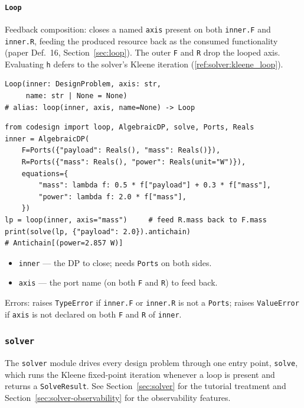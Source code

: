 \documentclass[11pt,a4paper]{article}
\begin{document}
\paragraph{\texttt{Loop}}
\label{ref:composition:loop}
Feedback composition: closes a named \texttt{axis} present on both
\texttt{inner.F} and \texttt{inner.R}, feeding the produced resource back
as the consumed functionality (paper Def.~16, Section~\ref{sec:loop}).
The outer \texttt{F} and \texttt{R} drop the looped axis. Evaluating
\texttt{h} defers to the solver's Kleene iteration
(\ref{ref:solver:kleene_loop}).
\begin{lstlisting}
Loop(inner: DesignProblem, axis: str,
     name: str | None = None)
# alias: loop(inner, axis, name=None) -> Loop
\end{lstlisting}
\begin{lstlisting}
from codesign import loop, AlgebraicDP, solve, Ports, Reals
inner = AlgebraicDP(
    F=Ports({"payload": Reals(), "mass": Reals()}),
    R=Ports({"mass": Reals(), "power": Reals(unit="W")}),
    equations={
        "mass": lambda f: 0.5 * f["payload"] + 0.3 * f["mass"],
        "power": lambda f: 2.0 * f["mass"],
    })
lp = loop(inner, axis="mass")     # feed R.mass back to F.mass
print(solve(lp, {"payload": 2.0}).antichain)
# Antichain[(power=2.857 W)]
\end{lstlisting}
\begin{itemize}[nosep]
  \item \texttt{inner} --- the DP to close; needs \texttt{Ports} on both
        sides.
  \item \texttt{axis} --- the port name (on both \texttt{F} and
        \texttt{R}) to feed back.
\end{itemize}
Errors: raises \texttt{TypeError} if \texttt{inner.F} or \texttt{inner.R}
is not a \texttt{Ports}; raises \texttt{ValueError} if \texttt{axis} is
not declared on both \texttt{F} and \texttt{R} of \texttt{inner}.

\subsubsection{\texttt{solver}}
\label{ref:solver}

The \texttt{solver} module drives every design problem through one entry
point, \texttt{solve}, which runs the Kleene fixed-point iteration
whenever a loop is present and returns a \texttt{SolveResult}. See
Section~\ref{sec:solver} for the tutorial treatment and
Section~\ref{sec:solver-observability} for the observability features.
\end{document}
